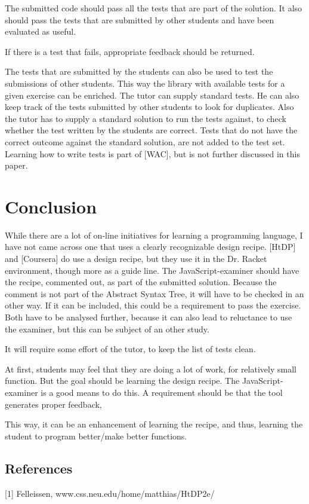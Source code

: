 \documentclass{article}
\begin{document}
The submitted code should pass all the tests that are part of the solution. It
also should pass the tests that are submitted by other students and have been
evaluated as useful.

If there is a test that fails, appropriate feedback should be returned. 

The tests that are submitted by the students can also be used to test the 
submissions of other students. This way the library with available tests for a
given exercise can be enriched.
The tutor can supply standard tests. He can also keep track of the tests
submitted by other students to look for duplicates.
Also the tutor has to supply a standard solution to run the tests against, to
check whether the test written by the students are correct.
Tests that do not have the correct outcome against the standard solution, are
not added to the test set.
Learning how to write tests is part of [WAC], but is not further discussed in
this paper.

\section{Conclusion}

While there are a lot of on-line initiatives for learning a programming language,
I have not came across one that uses a clearly recognizable design recipe.
[HtDP] and [Coursera] do use a design recipe, but they use it in the Dr. Racket
environment, though more as a guide line.
The JavaScript-examiner should have the recipe, commented out, as part of the
submitted solution. Because the comment is not part of the Abstract Syntax Tree,
it will have to be checked in an other way.
If it can be included, this could be a requirement to pass the exercise.
Both have to be analysed further, because it can also lead to reluctance to use
the examiner, but this can be subject of an other study.

It will require some effort of the tutor, to keep the list of tests clean.

At first, students may feel that they are doing a lot of work, for relatively
small function. But the goal should be learning the design recipe.
The JavaScript-examiner is a good means to do this.
A requirement should be that the tool generates proper feedback, 

This way, it can be an enhancement of learning the recipe, and thus, learning
the student to program better/make better functions.


\subsection{References}
[1]	Felleissen,
www.css.neu.edu/home/matthias/HtDP2e/
\end{document}
